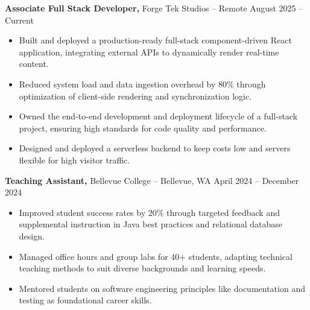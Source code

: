 \documentclass[11pt]{article}       %
\begin{document}
\textbf{Associate Full Stack Developer,} {Forge Tek Studios} -- Remote \hfill August 2025 -- Current 
\vspace{-9pt}
\begin{itemize}
  \item Built and deployed a production-ready full-stack component-driven React application, integrating external APIs to dynamically render real-time content.
  \item Reduced system load and data ingestion overhead by 80\% through optimization of client-side rendering and synchronization logic.
  \item Owned the end-to-end development and deployment lifecycle of a full-stack project, ensuring high standards for code quality and performance.
  \item Designed and deployed a serverless backend to keep costs low and servers flexible for high visitor traffic.
\end{itemize}

\textbf{Teaching Assistant,} {Bellevue College} -- Bellevue, WA \hfill April 2024 -- December 2024 \\
\vspace{-9pt}
\begin{itemize}
  \item Improved student success rates by 20\% through targeted feedback and supplemental instruction in Java best practices and relational database design.
  \item Managed office hours and group labs for 40+ students, adapting technical teaching methods to suit diverse backgrounds and learning speeds.
  \item Mentored students on software engineering principles like documentation and testing as foundational career skills.
\end{itemize}

\end{document}
